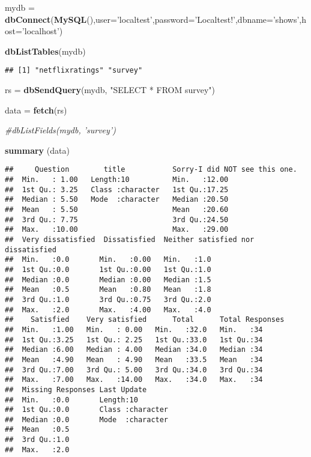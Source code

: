 \documentclass[
]{article}
\newenvironment{Shaded}{\begin{snugshade}}{\end{snugshade}}
\newcommand{\CommentTok}[1]{\textcolor[rgb]{0.56,0.35,0.01}{\textit{#1}}}
\newcommand{\DataTypeTok}[1]{\textcolor[rgb]{0.13,0.29,0.53}{#1}}
\newcommand{\KeywordTok}[1]{\textcolor[rgb]{0.13,0.29,0.53}{\textbf{#1}}}
\newcommand{\NormalTok}[1]{#1}
\newcommand{\StringTok}[1]{\textcolor[rgb]{0.31,0.60,0.02}{#1}}
\begin{document}
\begin{Shaded}
\begin{Highlighting}[]
\NormalTok{mydb =}\StringTok{ }\KeywordTok{dbConnect}\NormalTok{(}\KeywordTok{MySQL}\NormalTok{(),}\DataTypeTok{user=}\StringTok{'localtest'}\NormalTok{,}\DataTypeTok{password=}\StringTok{'Localtest!'}\NormalTok{,}\DataTypeTok{dbname=}\StringTok{'shows'}\NormalTok{,}\DataTypeTok{host=}\StringTok{'localhost'}\NormalTok{)}

\KeywordTok{dbListTables}\NormalTok{(mydb)}
\end{Highlighting}
\end{Shaded}

\begin{verbatim}
## [1] "netflixratings" "survey"
\end{verbatim}

\begin{Shaded}
\begin{Highlighting}[]
\NormalTok{rs =}\StringTok{ }\KeywordTok{dbSendQuery}\NormalTok{(mydb, }\StringTok{"SELECT * FROM survey"}\NormalTok{)}

\NormalTok{data =}\StringTok{ }\KeywordTok{fetch}\NormalTok{(rs)}

\CommentTok{#dbListFields(mydb, 'survey')}

\KeywordTok{summary}\NormalTok{ (data)}
\end{Highlighting}
\end{Shaded}

\begin{verbatim}
##     Question        title           Sorry-I did NOT see this one.
##  Min.   : 1.00   Length:10          Min.   :12.00                
##  1st Qu.: 3.25   Class :character   1st Qu.:17.25                
##  Median : 5.50   Mode  :character   Median :20.50                
##  Mean   : 5.50                      Mean   :20.60                
##  3rd Qu.: 7.75                      3rd Qu.:24.50                
##  Max.   :10.00                      Max.   :29.00                
##  Very dissatisfied  Dissatisfied  Neither satisfied nor dissatisfied
##  Min.   :0.0       Min.   :0.00   Min.   :1.0                       
##  1st Qu.:0.0       1st Qu.:0.00   1st Qu.:1.0                       
##  Median :0.0       Median :0.00   Median :1.5                       
##  Mean   :0.5       Mean   :0.80   Mean   :1.8                       
##  3rd Qu.:1.0       3rd Qu.:0.75   3rd Qu.:2.0                       
##  Max.   :2.0       Max.   :4.00   Max.   :4.0                       
##    Satisfied    Very satisfied      Total      Total Responses
##  Min.   :1.00   Min.   : 0.00   Min.   :32.0   Min.   :34     
##  1st Qu.:3.25   1st Qu.: 2.25   1st Qu.:33.0   1st Qu.:34     
##  Median :6.00   Median : 4.00   Median :34.0   Median :34     
##  Mean   :4.90   Mean   : 4.90   Mean   :33.5   Mean   :34     
##  3rd Qu.:7.00   3rd Qu.: 5.00   3rd Qu.:34.0   3rd Qu.:34     
##  Max.   :7.00   Max.   :14.00   Max.   :34.0   Max.   :34     
##  Missing Responses Last Update       
##  Min.   :0.0       Length:10         
##  1st Qu.:0.0       Class :character  
##  Median :0.0       Mode  :character  
##  Mean   :0.5                         
##  3rd Qu.:1.0                         
##  Max.   :2.0
\end{verbatim}
\end{document}
